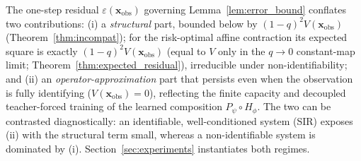 \begin{remark}
\label{rem:decomposition}
The one-step residual $\varepsilon(\mathbf{x}_\mathrm{obs})$ governing Lemma~\ref{lem:error_bound} conflates two contributions:
(i) a \emph{structural} part, bounded below by $(1-q)^2 V(\mathbf{x}_\mathrm{obs})$ (Theorem~\ref{thm:incompat}); for the risk-optimal affine contraction its expected square is exactly $(1-q)^2 V(\mathbf{x}_\mathrm{obs})$ (equal to $V$ only in the $q\to0$ constant-map limit; Theorem~\ref{thm:expected_residual}), irreducible under non-identifiability; and
(ii) an \emph{operator-approximation} part that persists even when the observation is fully identifying ($V(\mathbf{x}_\mathrm{obs})=0$), reflecting the finite capacity and decoupled teacher-forced training of the learned composition $P_\psi\!\circ\! H_\phi$.
The two can be contrasted diagnostically: an identifiable, well-conditioned system (SIR) exposes (ii) with the structural term small, whereas a non-identifiable system is dominated by (i). Section~\ref{sec:experiments} instantiates both regimes.
\end{remark}
